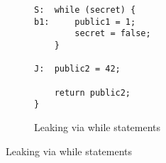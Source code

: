 \documentclass{llncs}
\begin{document}
\begin{figure}[t]
\begin{subfigure}{0.49\textwidth}
\begin{verbatim}
S:  while (secret) {
b1:     public1 = 1;
        secret = false;
    }

J:  public2 = 42;

    return public2;
}
\end{verbatim}
  \caption{Leaking via while statements}
  \label{fig:while}
  \end{subfigure}

  
\end{figure}





\end{document}
